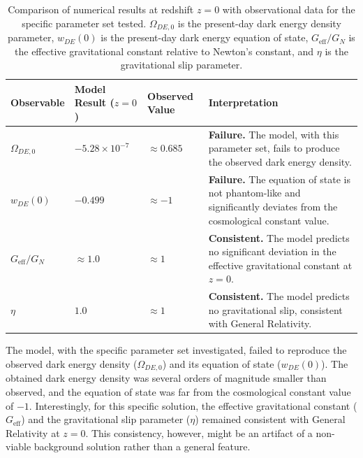 \documentclass[twocolumn]{aastex631}
\begin{document}
\begin{table}[ht!]
\caption{Comparison of numerical results at redshift $z=0$ with observational data for the specific parameter set tested. $\Omega_{DE,0}$ is the present-day dark energy density parameter, $w_{DE}(0)$ is the present-day dark energy equation of state, $G_{\text{eff}}/G_N$ is the effective gravitational constant relative to Newton's constant, and $\eta$ is the gravitational slip parameter.}
\label{tab:cosmo_results}
\centering
\begin{tabular}{p{} p{} p{} p{}}
\hline
\textbf{Observable} & \textbf{Model Result ($z=0$)} & \textbf{Observed Value} & \textbf{Interpretation} \\
\hline
$\Omega_{DE,0}$ & $-5.28 \times 10^{-7}$ & $\approx 0.685$ & \textbf{Failure.} The model, with this parameter set, fails to produce the observed dark energy density. \\
$w_{DE}(0)$ & $-0.499$ & $\approx -1$ & \textbf{Failure.} The equation of state is not phantom-like and significantly deviates from the cosmological constant value. \\
$G_{\text{eff}}/G_N$ & $\approx 1.0$ & $\approx 1$ & \textbf{Consistent.} The model predicts no significant deviation in the effective gravitational constant at $z=0$. \\
$\eta$ & $1.0$ & $\approx 1$ & \textbf{Consistent.} The model predicts no gravitational slip, consistent with General Relativity. \\
\hline
\end{tabular}
\end{table}

The model, with the specific parameter set investigated, failed to reproduce the observed dark energy density ($\Omega_{DE,0}$) and its equation of state ($w_{DE}(0)$). The obtained dark energy density was several orders of magnitude smaller than observed, and the equation of state was far from the cosmological constant value of $-1$. Interestingly, for this specific solution, the effective gravitational constant ($G_{\text{eff}}$) and the gravitational slip parameter ($\eta$) remained consistent with General Relativity at $z=0$. This consistency, however, might be an artifact of a non-viable background solution rather than a general feature.
\end{document}
